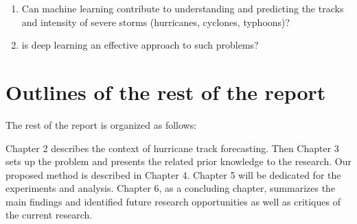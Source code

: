 \begin{enumerate}[label=\zdyxh*., leftmargin=5em]
	\item  Can machine learning contribute to understanding and predicting the tracks and intensity of severe storms (hurricanes, cyclones, typhoons)? 
	\item is deep learning an effective approach to such problems?
\end{enumerate}




\section{Outlines of the rest of the report}
The rest of the report is organized as follows:

Chapter 2 describes the context of hurricane track forecasting. Then Chapter 3 sets up the problem and presents the related prior knowledge to the research. Our proposed method is described in Chapter 4. Chapter 5 will be dedicated for the experiments and analysis. Chapter 6, as a concluding chapter, summarizes the main findings and identified future research opportunities as well as critiques of the current research.


